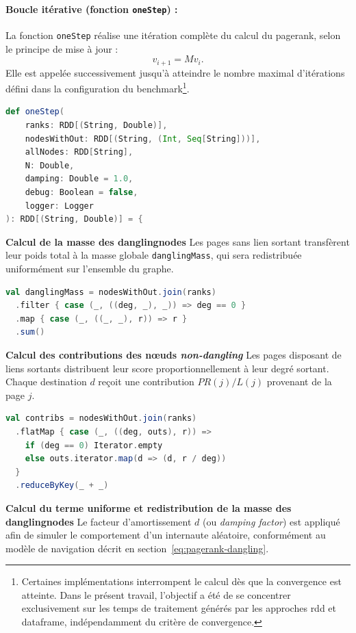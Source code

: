 \documentclass[conference]{IEEEtran}
\begin{document}
\paragraph{Boucle itérative (fonction \texttt{oneStep}) :}

La fonction \texttt{oneStep} réalise une itération complète du calcul du \gls{pagerank}, selon le principe de mise à jour :
\[
v_{i+1} = M  v_i.
\]
Elle est appelée successivement jusqu'à atteindre le nombre maximal d'itérations défini dans la configuration du benchmark\footnote{Certaines implémentations interrompent le calcul dès que la convergence est atteinte. Dans le présent travail, l'objectif a été de se concentrer exclusivement sur les temps de traitement générés par les approches \gls{rdd} et \gls{dataframe}, indépendamment du critère de convergence.}.

\begin{lstlisting}[language=Scala]
def oneStep(
    ranks: RDD[(String, Double)],
    nodesWithOut: RDD[(String, (Int, Seq[String]))],
    allNodes: RDD[String],
    N: Double,
    damping: Double = 1.0,
    debug: Boolean = false,
    logger: Logger
): RDD[(String, Double)] = {
\end{lstlisting}

\textbf{Calcul de la masse des \glspl{danglingnode}}  
Les pages sans lien sortant transfèrent leur poids total à la masse globale \texttt{danglingMass}, qui sera redistribuée uniformément sur l'ensemble du graphe.

\begin{lstlisting}[language=Scala]
val danglingMass = nodesWithOut.join(ranks)
  .filter { case (_, ((deg, _), _)) => deg == 0 }
  .map { case (_, ((_, _), r)) => r }
  .sum()
\end{lstlisting}

\textbf{Calcul des contributions des nœuds \textit{non-dangling}}  
Les pages disposant de liens sortants distribuent leur score proportionnellement à leur degré sortant.  
Chaque destination $d$ reçoit une contribution $PR(j) / L(j)$ provenant de la page $j$.

\begin{lstlisting}[language=Scala]
val contribs = nodesWithOut.join(ranks)
  .flatMap { case (_, ((deg, outs), r)) =>
    if (deg == 0) Iterator.empty
    else outs.iterator.map(d => (d, r / deg))
  }
  .reduceByKey(_ + _)
\end{lstlisting}

\textbf{Calcul du terme uniforme et redistribution de la masse des \glspl{danglingnode}}  
Le facteur d'amortissement $d$ (ou \textit{damping factor}) est appliqué afin de simuler le comportement d'un internaute aléatoire, conformément au modèle de navigation décrit en section~\ref{eq:pagerank-dangling}.
\end{document}
